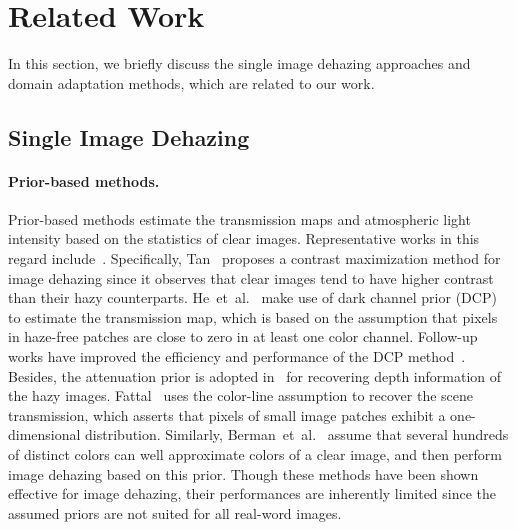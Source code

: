 \documentclass[10pt,twocolumn,letterpaper]{article}
\def\etal{et~al.\xspace}
\begin{document}
\section{Related Work}
In this section, we briefly discuss the single image dehazing approaches and domain adaptation methods, which are related to our work.
\subsection{Single Image Dehazing}
\paragraph{Prior-based methods.}
Prior-based methods estimate the transmission maps and atmospheric light intensity based on the statistics of clear images.
Representative works in this regard include~\cite{tan2008visibility,He2011Single,zhu2015fast,fattal2014dehazing,berman2016non}.
Specifically, Tan~\cite{tan2008visibility} proposes a contrast maximization method for image dehazing since it observes that clear images tend to have higher contrast than their hazy counterparts. 
He~\etal~\cite{He2011Single} make use of dark channel prior (DCP) to estimate the transmission map, which is based on the assumption that pixels in haze-free patches are close to zero in at least one color channel.
Follow-up works have improved the efficiency and performance of the DCP method~\cite{tarel2009fast, meng2013efficient, li2015nighttime, nishino2012bayesian, Yang_2018_ECCV}.
Besides, the attenuation prior is adopted in~\cite{zhu2015fast} for recovering depth information of the hazy images. 
Fattal~\cite{fattal2014dehazing} uses the color-line assumption to recover the scene transmission, which asserts that pixels of small image patches exhibit
a one-dimensional distribution.
Similarly, Berman~\etal~\cite{berman2016non} assume that several hundreds of distinct colors can well approximate colors of a clear image, and then perform image dehazing based on this prior.
Though these methods have been shown effective for image dehazing, their performances are inherently limited since the assumed priors are not suited for all real-word images.
\vspace{-4mm}
\end{document}

